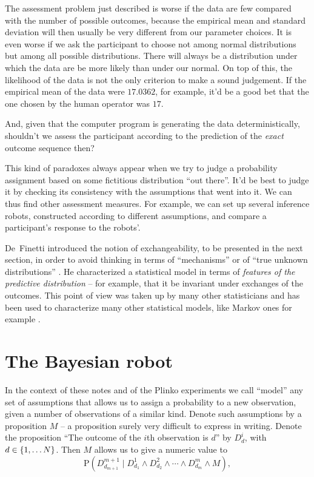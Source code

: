 \documentclass[\ifafour a4paper,12pt,\else a5paper,10pt,\fi%
onecolumn,oneside,article,%
british%
]{memoir}
\theoremstyle{remark}
\theoremstyle{innote}
\newcommand*{\citep}{\parencites}
\DeclarePairedDelimiter\set{\{}{\}}
\newcommand*{\p}{\mathrm{P}}%
\renewcommand*{\|}{\mathpunct{|}}
\newcommand*{\chap}{ch.}%
\newcommand*{\cf}{{cf.}}
\begin{document}
The assessment problem just described is worse if the data are few compared
with the number of possible outcomes, because the empirical mean and
standard deviation will then usually be very different from our parameter
choices. It is even worse if we ask the participant to choose not among
normal distributions but among all possible distributions. There will
always be a distribution under which the data are be more likely than under
our normal. On top of this, the likelihood of the data is not the only
criterion to make a sound judgement. If the empirical mean of the data
were $17.0362$, for example, it'd be a good bet that the one chosen by the
human operator was $17$.

And, given that the computer program is generating the data
deterministically, shouldn't we assess the participant according to the
prediction of the \emph{exact} outcome sequence then?

This kind of paradoxes always appear when we try to judge a probability
assignment based on some fictitious distribution \enquote{out there}. It'd
be best to judge it by checking its consistency with the assumptions that
went into it. We can thus find other assessment measures. For example, we
can set up several inference robots, constructed according to different
assumptions, and compare a participant's response to the robots'.


\medskip De~Finetti introduced the notion of exchangeability, to be
presented in the next section, in order to avoid thinking in terms of
\enquote{mechanisms} or of \enquote{true unknown distributions}
\citep[\cf][\chap~3]{good1965}. He characterized a statistical model in
terms of \emph{features of the predictive distribution} -- for example,
that it be invariant under exchanges of the outcomes. This point of view
was taken up by many other statisticians and has been used to characterize
many other statistical models, like Markov ones for example
\citep{freedman1962,diaconisetal1980c,zaman1984,fortinietal2002,fortinietal2014}.




\section{The Bayesian robot}
\label{sec:bayes_robot}

In the context of these notes and of the Plinko experiments
\citep{filipowiczetal2014,filipowiczetal2016} we call \enquote{model} any
set of assumptions that allows us to assign a probability to a new
observation, given a number of observations of a similar kind. Denote such
assumptions by a proposition $M$ -- a proposition surely very difficult to
express in writing. Denote the proposition \enquote{The outcome of the
  $i$th observation is $d$} by $D_{d}^i$, with $d \in \set{1,\dotsc N}$.
Then $M$ allows us to give a numeric value to
\begin{equation}
  \label{eq:general_prediction}
  \p(D^{m+1}_{d_{m+1}} \| D^1_{d_1} \land D^2_{d_2} \land \dotsb \land D^m_{d_m} \land M),
\end{equation}
\end{document}
